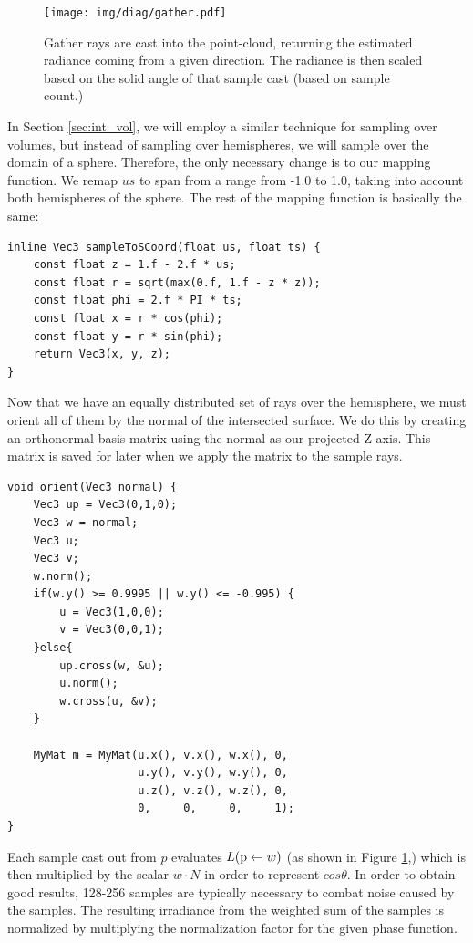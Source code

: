 \documentclass[12pt]{ucthesis}
\newcommand{\captionfonts}{\small\bf\ssp}
\begin{document}
\begin{figure}[h!]
    \centering
    \texttt{[image: img/diag/gather.pdf]}
    \captionfonts
    \caption{Gather rays are cast into the point-cloud, returning the estimated radiance coming from a given direction.  The radiance is then scaled based on the solid angle of that sample cast (based on sample count.)}
    \label{fig:gather}
\end{figure}

In Section \ref{sec:int_vol}, we will employ a similar technique for sampling over volumes, but instead of sampling over hemispheres, we will sample over the domain of a sphere.  Therefore, the only necessary change is to our mapping function.  We remap $us$ to span from a range from -1.0 to 1.0, taking into account both hemispheres of the sphere.  The rest of the mapping function is basically the same:

\begin{lstlisting}
inline Vec3 sampleToSCoord(float us, float ts) {
    const float z = 1.f - 2.f * us;
    const float r = sqrt(max(0.f, 1.f - z * z));
    const float phi = 2.f * PI * ts;
    const float x = r * cos(phi);
    const float y = r * sin(phi);
    return Vec3(x, y, z);
}
\end{lstlisting}

Now that we have an equally distributed set of rays over the hemisphere, we must orient all of them by the normal of the intersected surface.  We do this by creating an orthonormal basis matrix using the normal as our projected Z axis.  This matrix is saved for later when we apply the matrix to the sample rays.

\begin{lstlisting}
void orient(Vec3 normal) {
    Vec3 up = Vec3(0,1,0);
    Vec3 w = normal;
    Vec3 u;
    Vec3 v;
    w.norm();
    if(w.y() >= 0.9995 || w.y() <= -0.995) {
        u = Vec3(1,0,0);
        v = Vec3(0,0,1);
    }else{
        up.cross(w, &u);
        u.norm();
        w.cross(u, &v);
    }

    MyMat m = MyMat(u.x(), v.x(), w.x(), 0,
                    u.y(), v.y(), w.y(), 0,
                    u.z(), v.z(), w.z(), 0,
                    0,     0,     0,     1);
}
\end{lstlisting}

Each sample cast out from $p$ evaluates $L(\textup{p} \leftarrow w)$ (as shown in Figure \ref{fig:gather},) which is then multiplied by the scalar $w \cdot N$ in order to represent $cos\theta$.  In order to obtain good results, 128-256 samples are typically necessary to combat noise caused by the samples.  The resulting irradiance from the weighted sum of the samples is normalized by multiplying the normalization factor for the given phase function.
\end{document}
